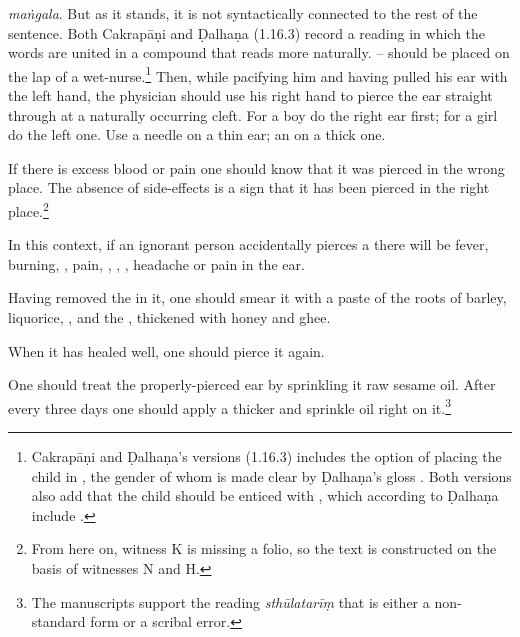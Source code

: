 \begin{translation}
{    \emph{maṅgala}.  But as it stands, it is not syntactically connected to the rest of the sentence.  Both Cakrapāṇi and Ḍalhaṇa (1.16.3) record a reading in which the words are united in a compound that reads more naturally.} -- should be placed on the lap of a wet-nurse.\footnote{Cakrapāṇi and Ḍalhaṇa's versions (1.16.3) includes the option of placing the child in ,  the gender of whom is made clear by  Ḍalhaṇa's gloss . Both versions also add that the child should be enticed with , which according to Ḍalhaṇa include .} Then, while pacifying him and having pulled his ear with the left hand, the physician should use his right hand to pierce the ear straight through at a naturally occurring cleft.  For a boy do
    the right ear first; for a girl do the left one. Use a needle on a
    thin ear; an  on a thick one.
    
    
    \item [3]  If there is excess blood or pain one should know that it was pierced
    in the wrong place. The absence of side-effects is a sign that it has been pierced 
    in the right place.\footnote{From here on, witness K is missing a folio, so the text 
    is constructed on the basis of witnesses N and H.}
    
    \item [4] In this context, if an ignorant person accidentally pierces a 
     there will 
    be fever, burning, , pain, , 
    , 
    , headache or pain in the ear. 
    
    \item[5]     Having removed the  in it, one should smear it with
    a paste of the roots of 
    barley, 
    liquorice, 
    , and the
    ,
    thickened with honey and ghee.
    
    When it has healed well, one should pierce it again.
    
    \item[6] One should treat the properly-pierced ear by sprinkling it raw sesame
    oil.   After every three days one should apply a thicker  and
    sprinkle oil right on it.\footnote{The manuscripts support the reading
    \emph{sthūlatarīṃ} that is either a non-standard form or a scribal error.}
    

\end{translation}
